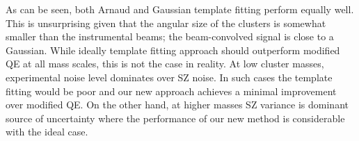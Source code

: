 As can be seen, both Arnaud and Gaussian template fitting perform equally well.
 This is unsurprising given that the angular size of the clusters is somewhat smaller than the instrumental beams; the beam-convolved signal is close to a Gaussian. 
While ideally template fitting approach should outperform modified QE at all mass scales, this is not the case in reality.
At low cluster masses, experimental noise level dominates over SZ noise.
 In such cases the template fitting would be poor and our new approach achieves a minimal improvement over modified QE. 
 On the other hand, at higher masses SZ variance is dominant source of uncertainty where the performance of our new method is considerable with the ideal case. %
